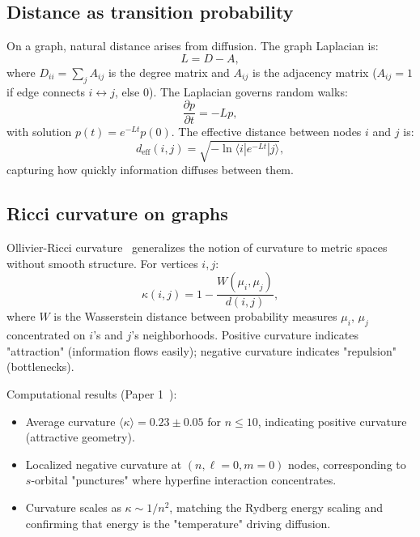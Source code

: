 \documentclass[aps,prd,twocolumn,superscriptaddress,groupedaddress,showpacs]{revtex4-2}
\begin{document}
\subsection{Distance as transition probability}

On a graph, natural distance arises from diffusion. The graph Laplacian is:
\begin{equation}
L = D - A,
\label{eq:laplacian}
\end{equation}
where $D_{ii} = \sum_j A_{ij}$ is the degree matrix and $A_{ij}$ is the adjacency matrix ($A_{ij} = 1$ if edge connects $i \leftrightarrow j$, else 0). The Laplacian governs random walks:
\begin{equation}
\frac{\partial p}{\partial t} = -L p,
\end{equation}
with solution $p(t) = e^{-Lt} p(0)$. The effective distance between nodes $i$ and $j$ is:
\begin{equation}
d_{\text{eff}}(i, j) = \sqrt{-\ln \langle i | e^{-Lt} | j \rangle},
\end{equation}
capturing how quickly information diffuses between them.

\subsection{Ricci curvature on graphs}

Ollivier-Ricci curvature~\cite{Ollivier2009} generalizes the notion of curvature to metric spaces without smooth structure. For vertices $i, j$:
\begin{equation}
\kappa(i, j) = 1 - \frac{W(\mu_i, \mu_j)}{d(i,j)},
\end{equation}
where $W$ is the Wasserstein distance between probability measures $\mu_i$, $\mu_j$ concentrated on $i$'s and $j$'s neighborhoods. Positive curvature indicates "attraction" (information flows easily); negative curvature indicates "repulsion" (bottlenecks).

Computational results (Paper 1~\cite{Louthan_I}):
\begin{itemize}
\item Average curvature $\langle \kappa \rangle = 0.23 \pm 0.05$ for $n \leq 10$, indicating positive curvature (attractive geometry).
\item Localized negative curvature at $(n, \ell=0, m=0)$ nodes, corresponding to $s$-orbital "punctures" where hyperfine interaction concentrates.
\item Curvature scales as $\kappa \sim 1/n^2$, matching the Rydberg energy scaling and confirming that energy is the "temperature" driving diffusion.
\end{itemize}
\end{document}
